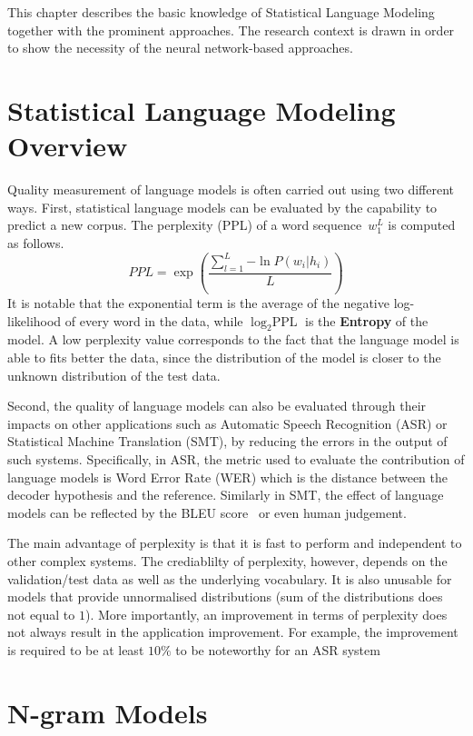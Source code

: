 This chapter describes the basic knowledge of Statistical Language Modeling together with the prominent approaches. The research context is 
drawn in order to show the necessity of the neural network-based approaches. 
\section{Statistical Language Modeling Overview}

Quality measurement of language models is often carried out using two different ways. First, statistical language models can be evaluated by the capability to predict a new corpus. The perplexity (PPL) of a word sequence~\textbf{$w_1^L$} is computed as follows.
\begin{equation}
\label{eq:ppl}
PPL = \exp(\frac{\sum_{l=1}^L{-\ln P(w_i|h_i)}}{L}  )
\end{equation}
It is notable that the exponential term is the average of the negative log-likelihood of every word in the data, while $\log_2 \text{PPL}$ is the \textbf{Entropy} of the model. A low perplexity value corresponds to the fact that the language model is able to fits better the data, since the distribution of the model is closer to the unknown distribution of the test data. 

Second, the quality of language models can also be evaluated through their impacts on other applications such as Automatic Speech Recognition (ASR) or Statistical Machine Translation (SMT), by reducing the errors in the output of such systems. Specifically, in ASR, the metric used to evaluate the contribution of language models is Word Error Rate (WER) which is the distance between the decoder hypothesis and the reference. Similarly in SMT, the effect of language models can be reflected by the BLEU score~\cite{papineni2002bleu} or even human judgement. 

The main advantage of perplexity is that it is fast to perform and independent to other complex systems. The crediablilty of perplexity, however, depends on the validation/test data as well as the underlying vocabulary. It is also unusable for models that provide unnormalised distributions (sum of the distributions does not equal to $1$). More importantly, an improvement in terms of perplexity does not always result in the application improvement. For example, the improvement is required to be at least $10\%$ to be noteworthy for an ASR system~\cite{Rosenfeld:2000}


\section{N-gram Models}

